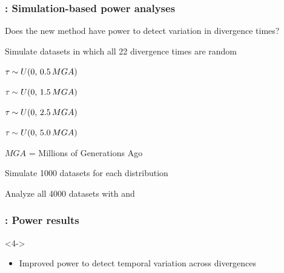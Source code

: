 \begin{frame}
    \frametitle{\dppmsbayes: Simulation-based power analyses}
    Does the new method have power to detect variation in divergence times?\\

    \bigskip
    \begin{myitemize}
        \item<2-> Simulate datasets in which all 22 divergence times are random
            \smallskip
            \begin{myitemize}
                \item $\tau_{} \sim U(0, \,0.5 \,MGA)$
                \smallskip
                \item $\tau_{} \sim U(0, \,1.5 \,MGA)$
                \smallskip
                \item $\tau_{} \sim U(0, \,2.5 \,MGA)$
                \smallskip
                \item $\tau_{} \sim U(0, \,5.0 \,MGA)$
                \smallskip
            \end{myitemize}
        \item<2-> $MGA$ = Millions of Generations Ago

        \item<3-> Simulate 1000 datasets for each \divTime{} distribution
        \item<3-> Analyze all 4000 datasets with \msb and \dppmsbayes
    \end{myitemize}
\end{frame}

\begin{frame}[t]
    \frametitle{\dppmsbayes: Power results}


    \begin{uncoverenv}<4->
    \begin{itemize}
        \item Improved power to detect temporal variation across divergences
    \end{itemize}
    \end{uncoverenv}
\end{frame}

